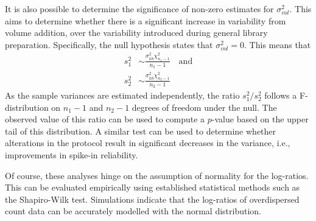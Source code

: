 \documentclass{article}
\begin{document}

It is also possible to determine the significance of non-zero estimates for $\sigma^2_{vol}$.
This aims to determine whether there is a significant increase in variability from volume addition, over the variability introduced during general library preparation.
Specifically, the null hypothesis states that $\sigma^2_{vol} = 0$.
This means that
\begin{align*}
s^2_1 &\sim \frac{\sigma^2_{lib} \chi^2_{n_1 - 1}}{n_1 - 1} \quad\mbox{and} \\
s^2_2 &\sim \frac{\sigma^2_{lib} \chi^2_{n_2 - 1}}{n_2 - 1} 
\end{align*}
As the sample variances are estimated independently, the ratio $s^2_1/s^2_2$ follows a F-distribution on $n_1-1$ and $n_2-1$ degrees of freedom under the null.
The observed value of this ratio can be used to compute a $p$-value based on the upper tail of this distribution.
A similar test can be used to determine whether alterations in the protocol result in significant decreases in the variance, i.e., improvements in spike-in reliability.

Of course, these analyses hinge on the assumption of normality for the log-ratios. 
This can be evaluated empirically using established statistical methods such as the Shapiro-Wilk test.
Simulations indicate that the log-ratios of overdispersed count data can be accurately modelled with the normal distribution.
\end{document}
